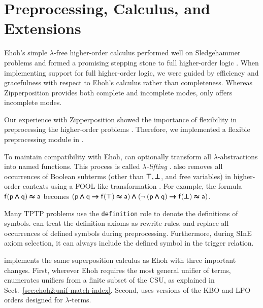 



\section{Preprocessing, Calculus, and Extensions}
\label{sec:ehoh2:calculus}

Ehoh's simple $\lambda$-free higher-order calculus performed well on
Sledgehammer problems and formed a promising stepping stone to full higher-order
logic \cite{section-ehoh}. When implementing support for full higher-order
logic, we were guided by efficiency and gracefulness with respect to Ehoh's calculus rather
than completeness. Whereas Zipperposition provides both complete and incomplete
modes, \ehohii{} only offers incomplete modes.

 Our experience with Zipperposition showed the importance
of flexibility in preprocessing the higher-order problems
\cite{section-making-ho-work}. Therefore, we implemented a flexible
preprocessing module in \ehohii{}. 

To maintain compatibility with Ehoh, \ehohii{} can optionally transform all
$\lambda$-abstractions into named functions. This process is called
\emph{$\lambda$-lifting} \cite{rjmh-82-lifting}. \ehohii{} also removes all
occurrences of Boolean subterms (other than $\pmb\top, \pmb\bot$, and free variables)
in higher-order contexts using a FOOL-like transformation \cite{kotelnikov-16-fool}.
For example, the formula $\mathsf{f}(\mathsf{p} \pmb\land \mathsf{q}) \pmb\approx \mathsf{a}$ becomes
$(\mathsf{p} \pmb\land \mathsf{q} \pmb\rightarrow \mathsf{f}(\pmb\top) \pmb\approx \mathsf{a}) \pmb\land
(\pmb{\neg\,}(\mathsf{p} \pmb\land \mathsf{q}) \pmb\rightarrow \mathsf{f}(\pmb\bot) \pmb\approx \mathsf{a})$.

Many TPTP problems use the \texttt{definition} role to denote the definitions of
symbols. \ehohii{} can treat the definition axioms as rewrite rules, and replace
all occurrences of defined symbols during preprocessing. Furthermore, during
SInE \cite{hv-2011-sine} axiom selection, it can always
include the defined symbol in the trigger relation.

 \ehohii{} implements the same superposition
calculus as Ehoh with three important changes. First, wherever Ehoh requires
the most general unifier of terms, \ehohii{} enumerates unifiers from a finite subset of the CSU, as explained in
Sect.~\ref{sec:ehoh2:unif-match-index}. Second, \ehohii{} uses versions of the KBO and
LPO orders designed for $\lambda$-terms.

